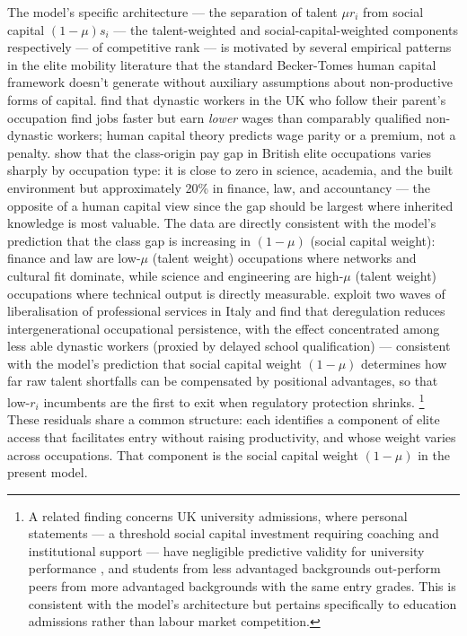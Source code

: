 \documentclass[
    oneside,
    fontsize=10pt,leqno]{article}
\begin{document}
The model's specific architecture --- the separation of talent
$\mu r_i$ from social capital $(1-\mu)s_i$ --- the talent-weighted and social-capital-weighted components respectively ---
of competitive rank --- is motivated by several empirical patterns
in the elite mobility literature that the standard Becker-Tomes
human capital framework doesn't generate without
auxiliary assumptions about non-productive forms of capital.
\citet{LoBelloMorchio2022} find that dynastic workers in the UK
who follow their parent's occupation find jobs faster but earn
\emph{lower} wages than comparably qualified non-dynastic workers;
human capital theory predicts wage parity or a premium, not a
penalty. \citet{LaurisonFriedman2016} show that the class-origin
pay gap in British elite occupations varies sharply by occupation
type: it is close to zero in science, academia, and the built
environment but approximately 20\% in finance, law, and
accountancy --- the opposite of a human capital view since 
the gap should be largest where inherited knowledge is most
valuable. The data are directly consistent with the model's
prediction that the class gap is increasing in $(1-\mu)$ (social capital weight):
finance and law are low-$\mu$ (talent weight) occupations
where networks and cultural fit dominate, while science and
engineering are high-$\mu$ (talent weight) occupations where technical output is
directly measurable. \citet{MockettiRomaRubolino2022} exploit two waves of liberalisation of professional services in Italy and find that deregulation reduces intergenerational occupational persistence, with the effect concentrated among less able dynastic workers (proxied by delayed school qualification) --- consistent with the model's prediction that social capital weight $(1-\mu)$ determines how far raw talent shortfalls can be compensated by positional advantages, so that low-$r_i$ incumbents are the first to exit when regulatory protection shrinks.
\footnote{A related finding concerns
UK university admissions, where personal statements --- a threshold
social capital investment requiring coaching and institutional
support --- have negligible predictive validity for university
performance \citep{JonesSuttonTrust2013}, and students from less
advantaged backgrounds out-perform peers from more advantaged
backgrounds with the same entry grades. This is consistent with
the model's architecture but pertains specifically to education
admissions rather than labour market competition.} These residuals
share a common structure: each identifies a component of elite
access that facilitates entry without raising productivity, and
whose weight varies across occupations. That component is the
social capital weight $(1-\mu)$ in the present model.
\end{document}
